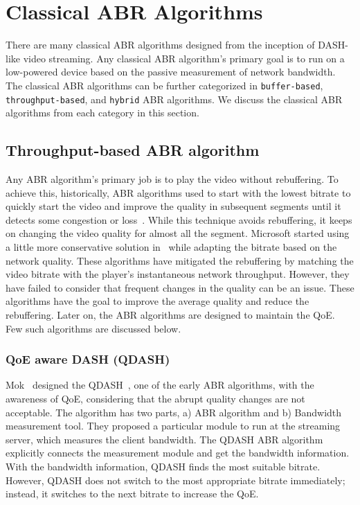 \section{Classical ABR Algorithms}
There are many classical \ac{ABR} algorithms designed from the inception of \ac{DASH}-like video streaming. Any classical \ac{ABR} algorithm's primary goal is to run on a low-powered device based on the passive measurement of network bandwidth. The classical \ac{ABR} algorithms can be further categorized in {\tt buffer-based}, {\tt throughput-based}, and {\tt hybrid} \ac{ABR} algorithms. We discuss the classical \ac{ABR} algorithms from each category in this section.

\subsection{Throughput-based ABR algorithm}
Any \ac{ABR} algorithm's primary job is to play the video without rebuffering. To achieve this, historically, \ac{ABR} algorithms used to start with the lowest bitrate to quickly start the video and improve the quality in subsequent segments until it detects some congestion or loss~\cite{5677508,10.1145/1943552.1943575}. While this technique avoids rebuffering, it keeps on changing the video quality for almost all the segment. Microsoft started using a little more conservative solution in~\cite{10.1145/1943552.1943574} while adapting the bitrate based on the network quality. These algorithms have mitigated the rebuffering by matching the video bitrate with the player's instantaneous network throughput. However, they have failed to consider that frequent changes in the quality can be an issue. These algorithms have the goal to improve the average quality and reduce the rebuffering. Later on, the \ac{ABR} algorithms are designed to maintain the \ac{QoE}. Few such algorithms are discussed below.

\subsubsection{QoE aware DASH (QDASH)}
Mok \etal\ designed the QDASH~\cite{10.1145/2155555.2155558}, one of the early \ac{ABR} algorithms, with the awareness of \ac{QoE}, considering that the abrupt quality changes are not acceptable. The algorithm has two parts, a) \ac{ABR} algorithm and b) Bandwidth measurement tool. They proposed a particular module to run at the streaming server, which measures the client bandwidth. The QDASH \ac{ABR} algorithm explicitly connects the measurement module and get the bandwidth information. With the bandwidth information, QDASH finds the most suitable bitrate. However, QDASH does not switch to the most appropriate bitrate immediately; instead, it switches to the next bitrate to increase the \ac{QoE}.

